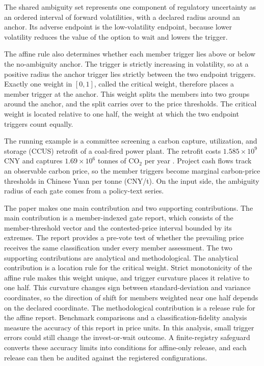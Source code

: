 \documentclass[5p,times,authoryear]{elsarticle}
\theoremstyle{plain}
\begin{document}
The shared ambiguity set represents one component of regulatory uncertainty as an ordered interval of forward volatilities, with a declared radius around an anchor. Its adverse endpoint is the low-volatility endpoint, because lower volatility reduces the value of the option to wait and lowers the trigger.

The affine rule also determines whether each member trigger lies above or below the no-ambiguity anchor. The trigger is strictly increasing in volatility, so at a positive radius the anchor trigger lies strictly between the two endpoint triggers. Exactly one weight in $[0,1]$, called the critical weight, therefore places a member trigger at the anchor. This weight splits the members into two groups around the anchor, and the split carries over to the price thresholds. The critical weight is located relative to one half, the weight at which the two endpoint triggers count equally.

The running example is a committee screening a carbon capture, utilization, and storage (CCUS) retrofit of a coal-fired power plant. The retrofit costs $1.585\times10^{9}$\,CNY and captures $1.69\times10^{6}$ tonnes of CO$_2$ per year \citep{Sun2024}. Project cash flows track an observable carbon price, so the member triggers become marginal carbon-price thresholds in Chinese Yuan per tonne (CNY/t). On the input side, the ambiguity radius of each gate comes from a policy-text series.

The paper makes one main contribution and two supporting contributions. The main contribution is a member-indexed gate report, which consists of the member-threshold vector and the contested-price interval bounded by its extremes. The report provides a pre-vote test of whether the prevailing price receives the same classification under every member assessment. The two supporting contributions are analytical and methodological. The analytical contribution is a location rule for the critical weight. Strict monotonicity of the affine rule makes this weight unique, and trigger curvature places it relative to one half. This curvature changes sign between standard-deviation and variance coordinates, so the direction of shift for members weighted near one half depends on the declared coordinate. The methodological contribution is a release rule for the affine report. Benchmark comparisons and a classification-fidelity analysis measure the accuracy of this report in price units. In this analysis, small trigger errors could still change the invest-or-wait outcome. A finite-registry safeguard converts these accuracy limits into conditions for affine-only release, and each release can then be audited against the registered configurations.
\end{document}
